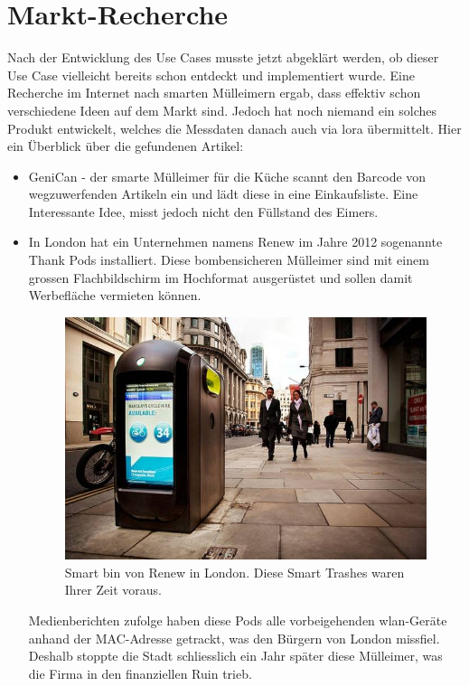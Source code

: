\section{Markt-Recherche}
Nach der Entwicklung des Use Cases musste jetzt abgeklärt werden, ob dieser Use Case vielleicht bereits schon entdeckt und implementiert wurde. Eine Recherche im Internet nach smarten Mülleimern ergab, dass effektiv schon verschiedene Ideen auf dem Markt sind. Jedoch hat noch niemand ein solches Produkt entwickelt, welches die Messdaten danach auch via \gls{lora} übermittelt. Hier ein Überblick über die gefundenen Artikel:
\begin{itemize}  
  \item GeniCan\autocite{market:genican} - der smarte Mülleimer für die Küche scannt den Barcode von wegzuwerfenden Artikeln ein und lädt diese in eine Einkaufsliste. Eine Interessante Idee, misst jedoch nicht den Füllstand des Eimers.
  \item In London hat ein Unternehmen namens \glqq{}Renew\grqq{} im Jahre 2012 sogenannte \glqq{}Thank Pods\grqq{}\autocite{market:LondonBins} installiert. Diese bombensicheren Mülleimer sind mit einem grossen Flachbildschirm im Hochformat ausgerüstet und sollen damit Werbefläche vermieten können. 
   \begin{figure}[H]
     \centering
        \includegraphics[scale=0.5]{pictures/London_Thank_Pod_Renew.jpg}
    \caption{\glqq{}Smart bin\grqq{} von \glqq{}Renew\grqq{} in London. Diese \glqq{}Smart Trashes\grqq{} waren Ihrer Zeit voraus.}
    \label{fig:LondonSmartBin}
\end{figure} 
Medienberichten zufolge haben diese Pods alle vorbeigehenden \gls{wlan}-Geräte anhand der MAC-Adresse getrackt, was den Bürgern von London missfiel. Deshalb stoppte die Stadt schliesslich ein Jahr später diese Mülleimer\autocite{market:LondonBinsStop}, was die Firma in den finanziellen Ruin trieb\autocite{market:LondonBinRuin}.

\end{itemize}
